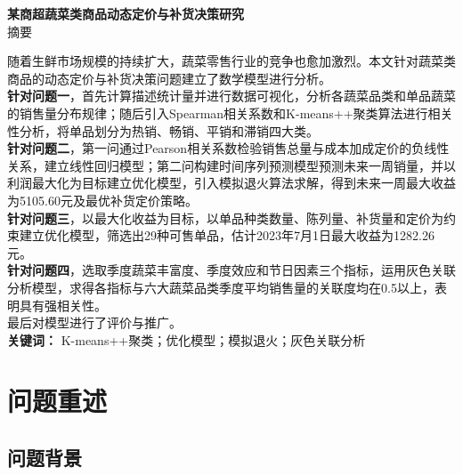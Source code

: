 \documentclass[a4paper,12pt]{article}
\begin{document}
	
	\begin{center}
		{\LARGE\bfseries 某商超蔬菜类商品动态定价与补货决策研究} \\[0.5cm]
		{\large 摘要} \\[0.3cm]
	\end{center}
	
	\noindent 随着生鲜市场规模的持续扩大，蔬菜零售行业的竞争也愈加激烈。本文针对蔬菜类商品的动态定价与补货决策问题建立了数学模型进行分析。\\[0.3cm]
	
	\noindent \textbf{针对问题一}，首先计算描述统计量并进行数据可视化，分析各蔬菜品类和单品蔬菜的销售量分布规律；随后引入Spearman相关系数和K-means++聚类算法进行相关性分析，将单品划分为热销、畅销、平销和滞销四大类。\\[0.3cm]
	
	\noindent \textbf{针对问题二}，第一问通过Pearson相关系数检验销售总量与成本加成定价的负线性关系，建立线性回归模型；第二问构建时间序列预测模型预测未来一周销量，并以利润最大化为目标建立优化模型，引入模拟退火算法求解，得到未来一周最大收益为5105.60元及最优补货定价策略。\\[0.3cm]
	
	\noindent \textbf{针对问题三}，以最大化收益为目标，以单品种类数量、陈列量、补货量和定价为约束建立优化模型，筛选出29种可售单品，估计2023年7月1日最大收益为1282.26元。\\[0.3cm]
	
	\noindent \textbf{针对问题四}，选取季度蔬菜丰富度、季度效应和节日因素三个指标，运用灰色关联分析模型，求得各指标与六大蔬菜品类季度平均销售量的关联度均在0.5以上，表明具有强相关性。\\[0.3cm]
	
	\noindent 最后对模型进行了评价与推广。\\[0.3cm]
	
	\noindent \textbf{关键词：} K-means++聚类；优化模型；模拟退火；灰色关联分析
	
	\newpage
	
	
	\section{问题重述}
	
	\subsection{问题背景}
	
\end{document}
